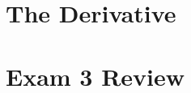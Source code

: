 \documentclass[12pt, oneside]{book}
\renewcommand{\theenumi}{\alph{enumi}}
\renewcommand{\labelenumi}{(\theenumi)}
\begin{document}

% 

% 

% 

% 
\setcounter{chapter}{4}


\chapter{The Derivative}\label{Derivative}
\vspace*{-0.25in}


\chapter*{Exam 3 Review}\label{Review3}
\vspace*{-0.25in}



\renewcommand{\theenumi}{\alph{enumi}}
\renewcommand{\labelenumi}{(\theenumi)}
% 
\end{document}

